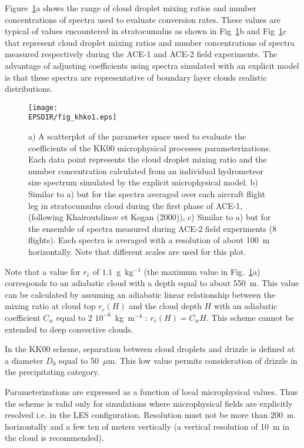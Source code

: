 Figure~\ref{figKHKO}a shows the range of cloud droplet mixing ratios and number concentrations of spectra used to evaluate conversion rates. These values are typical of values encountered in stratocumulus as shown in Fig~\ref{figKHKO}b and Fig~\ref{figKHKO}c that represent cloud droplet mixing ratios and number concentrations of spectra measured respectively during the ACE-1 and 
ACE-2 field experiments. The advantage of adjusting coefficients using spectra simulated with an explicit model is that these spectra are representative of boundary layer clouds realistic distributions.

\begin{figure}[!ht]
\centerline{\texttt{[image: \\EPSDIR/fig\_khko1.eps]}}
\caption{ a) A scatterplot of the parameter space used to evaluate the coefficients of the KK00  microphysical processes parameterizations. Each data point represents the cloud droplet mixing ratio and the number concentration calculated from an individual hydrometeor size spectrum simulated by the explicit microphysical model.
b) Similar to a) but for the spectra averaged over each aircraft flight leg in stratocumulus cloud during the first phase of ACE-1,
(following Khairoutdinov et Kogan (2000)),
c) Similar to a) but for the ensemble of spectra measured during ACE-2 field experiments (8 flights). Each spectra is averaged with a resolution of about 100~m horizontally. Note that different scales are used for this plot.}
\label{figKHKO} 
\end{figure}


Note that a value for $r_c$ of $1.1$~g~kg$^{-1}$ (the maximum value in Fig.~\ref{figKHKO}a) corresponds to an adiabatic cloud with a depth equal to about 550~m. This value can be calculated by assuming an adiabatic linear relationship between the mixing ratio at cloud top $r_c(H)$ and the cloud depth $H$ with an adiabatic coefficient $C_w$ equal to $2$ $10^{-6}$~kg~m$^{-4}$ : $r_c(H) = C_w H$. This scheme cannot be extended to deep convective clouds. 

In the KK00 scheme, separation between cloud droplets and drizzle is defined at a diameter $D_0$ equal to 50~$\mu$m. This low value permits consideration of drizzle in the precipitating category.

\noindent Parameterizations are expressed as a function of local microphysical values. Thus the scheme is valid only for simulations where microphysical fields are explicitly resolved i.e. in the LES configuration. Resolution must not be more than 200~m horizontally and a few ten of meters vertically (a vertical resolution of 10~m in the cloud is recommended).   


